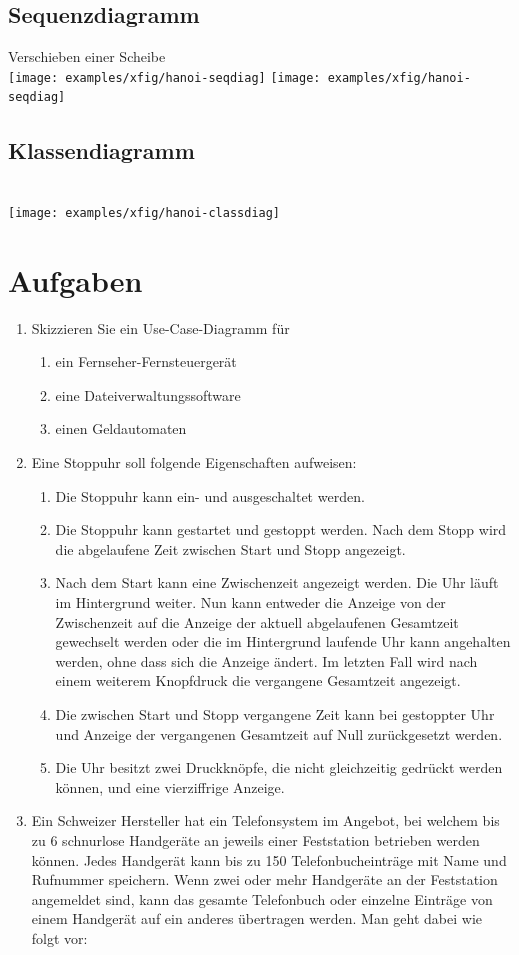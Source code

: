 \subsection{Sequenzdiagramm} Verschieben einer Scheibe\\[2ex]
\ifslides
\texttt{[image: examples/xfig/hanoi-seqdiag]}
\else
\texttt{[image: examples/xfig/hanoi-seqdiag]}
\fi
\subsection{Klassendiagramm}\ \\[2ex]
\texttt{[image: examples/xfig/hanoi-classdiag]}
%
\newpage
\section{Aufgaben}
\begin{enumerate}
%
\item Skizzieren Sie ein Use-Case-Diagramm für
  \begin{enumerate}
  \item ein Fernseher-Fernsteuergerät
  \item eine Dateiverwaltungssoftware
  \item einen Geldautomaten
  \end{enumerate}
\newslide
\item Eine Stoppuhr soll folgende Eigenschaften aufweisen:
\begin{enumerate}
  \item Die Stoppuhr kann ein- und ausgeschaltet werden.
  \item Die Stoppuhr kann gestartet und gestoppt werden. Nach dem
  Stopp wird die abgelaufene Zeit zwischen Start und Stopp angezeigt.
  \item Nach dem Start kann eine Zwischenzeit angezeigt werden.
   Die Uhr läuft im Hintergrund weiter. Nun kann entweder die
   Anzeige von der Zwischenzeit auf die Anzeige 
   der aktuell abgelaufenen Gesamtzeit gewechselt werden
   oder die im Hintergrund laufende Uhr kann angehalten werden,
   ohne dass sich die Anzeige ändert. Im letzten Fall
   wird nach einem weiterem Knopfdruck die vergangene 
  Gesamtzeit angezeigt.
  \item Die zwischen Start und Stopp vergangene Zeit kann
   bei gestoppter Uhr und Anzeige der vergangenen Gesamtzeit
   auf Null zurückgesetzt werden.
 \item Die Uhr besitzt zwei Druckknöpfe, die nicht gleichzeitig
  gedrückt werden können, und eine vierziffrige Anzeige.
\end{enumerate}
\newslide
\item Ein Schweizer Hersteller hat ein Telefonsystem im Angebot, bei welchem
  bis zu 6 schnurlose Handgeräte an jeweils einer Feststation betrieben werden
  können. Jedes Handgerät kann bis zu 150 Telefonbucheinträge mit Name und
  Rufnummer 
  speichern. Wenn zwei oder mehr Handgeräte an der Feststation angemeldet sind,
  kann das gesamte Telefonbuch oder einzelne Einträge von einem Handgerät
  auf ein anderes übertragen werden. Man geht dabei wie folgt vor:


\end{enumerate}
